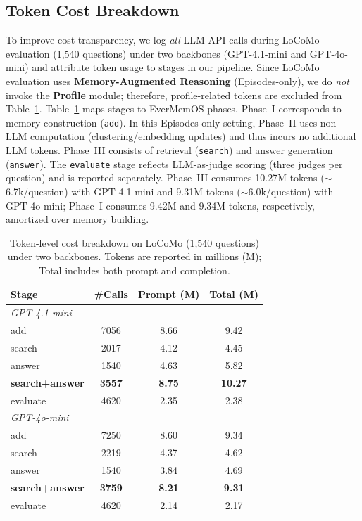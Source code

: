\subsection{Token Cost Breakdown}

To improve cost transparency, we log \emph{all} LLM API calls during LoCoMo evaluation (1,540 questions) under two backbones (GPT-4.1-mini and GPT-4o-mini) and attribute token usage to stages in our pipeline. Since LoCoMo evaluation uses \textbf{Memory-Augmented Reasoning} (Episodes-only), we do \emph{not} invoke the \textbf{Profile} module; therefore, profile-related tokens are excluded from Table~\ref{tab:token_cost}. Table~\ref{tab:token_cost} maps stages to EverMemOS phases. Phase~I corresponds to memory construction (\texttt{add}). In this Episodes-only setting, Phase~II uses non-LLM computation (clustering/embedding updates) and thus incurs no additional LLM tokens. Phase~III consists of retrieval (\texttt{search}) and answer generation (\texttt{answer}). The \texttt{evaluate} stage reflects LLM-as-judge scoring (three judges per question) and is reported separately. Phase~III consumes 10.27M tokens ($\sim$6.7k/question) with GPT-4.1-mini and 9.31M tokens ($\sim$6.0k/question) with GPT-4o-mini; Phase~I consumes 9.42M and 9.34M tokens, respectively, amortized over memory building.

\begin{table}[!h]
  \centering
  \small
  \setlength{\tabcolsep}{3pt}
  \renewcommand{\arraystretch}{0.95}
  \caption{Token-level cost breakdown on LoCoMo (1,540 questions) under two backbones. Tokens are reported in millions (M); Total includes both prompt and completion.}
  \label{tab:token_cost}
  \begin{tabular}{l c c c}
    \toprule
    \textbf{Stage} & \textbf{\#Calls} & \textbf{Prompt (M)} & \textbf{Total (M)} \\
    \midrule
    \multicolumn{4}{l}{\textit{GPT-4.1-mini}} \\[-2pt]
    add & 7056 & 8.66 & 9.42 \\
    search & 2017 & 4.12 & 4.45 \\
    answer & 1540 & 4.63 & 5.82 \\
    \addlinespace[1pt]
    \textbf{search+answer} & \textbf{3557} & \textbf{8.75} & \textbf{10.27} \\
    evaluate & 4620 & 2.35 & 2.38 \\
    \midrule
    \multicolumn{4}{l}{\textit{GPT-4o-mini}} \\[-2pt]
    add & 7250 & 8.60 & 9.34 \\
    search & 2219 & 4.37 & 4.62 \\
    answer & 1540 & 3.84 & 4.69 \\
    \addlinespace[1pt]
    \textbf{search+answer} & \textbf{3759} & \textbf{8.21} & \textbf{9.31} \\
    evaluate & 4620 & 2.14 & 2.17 \\
    \bottomrule
  \end{tabular}
\end{table}

